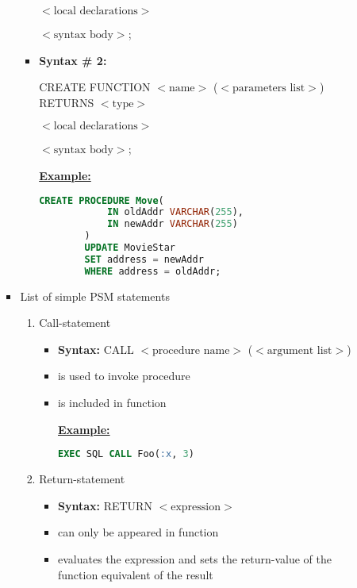 \documentclass[12pt]{article}
\begin{document}
\begin{enumerate}[1.]
\begin{enumerate}[a)]
\begin{itemize}
\begin{itemize}
                    $<\text{local declarations}>$

                    $<\text{syntax body}>$;

                \item \textbf{Syntax \# 2:}

                \bigskip

                CREATE FUNCTION $<\text{name}>$ ($<\text{parameters list}>$) RETURNS $<\text{type}>$

                    $<\text{local declarations}>$

                    $<\text{syntax body}>$;

                \bigskip

                \underline{\textbf{Example:}}

                \bigskip

        \begin{lstlisting}[language=SQL]
        CREATE PROCEDURE Move(
            IN oldAddr VARCHAR(255),
            IN newAddr VARCHAR(255)
        )
        UPDATE MovieStar
        SET address = newAddr
        WHERE address = oldAddr;
        \end{lstlisting}

            \end{itemize}

            \item List of simple PSM statements
            \begin{enumerate}[1.]
                \item Call-statement
                \begin{itemize}
                    \item \textbf{Syntax:} CALL $<\text{procedure name}>$ ($<\text{argument list}>$)
                    \item is used to invoke procedure
                    \item is included in function

                    \bigskip

                    \underline{\textbf{Example:}}

                    \bigskip

    \begin{lstlisting}[language=SQL]
    EXEC SQL CALL Foo(:x, 3)
    \end{lstlisting}

                \end{itemize}
                \item Return-statement
                \begin{itemize}
                    \item \textbf{Syntax:} RETURN $<\text{expression}>$
                    \item can only be appeared in function
                    \item evaluates the expression and sets the return-value of the function
                    equivalent of the result


\end{itemize}
\end{enumerate}
\end{itemize}
\end{enumerate}
\end{enumerate}
\end{document}
